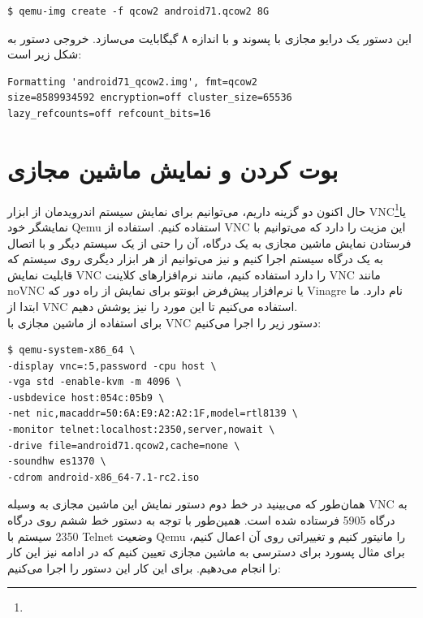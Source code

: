 \documentclass{article}
\begin{document}
\begin{latin}
\begin{verbatim}
$ qemu-img create -f qcow2 android71.qcow2 8G
\end{verbatim}
\end{latin}

این دستور یک درایو مجازی با پسوند  و با اندازه ۸ گیگابایت می‌سازد. خروجی دستور به شکل زیر است:

\begin{latin}
\begin{verbatim}
Formatting 'android71_qcow2.img', fmt=qcow2
size=8589934592 encryption=off cluster_size=65536
lazy_refcounts=off refcount_bits=16
\end{verbatim}
\end{latin}

\section*{بوت کردن و نمایش ماشین مجازی}

حال اکنون دو گزینه داریم، می‌توانیم برای نمایش سیستم اندرویدمان از ابزار VNC\footnote{}\cite{2}یا نمایشگر خود Qemu استفاده کنیم. استفاده از VNC این مزیت را دارد که می‌توانیم با فرستادن نمایش ماشین مجازی به یک درگاه، آن را حتی از یک سیستم دیگر و با اتصال به یک درگاه سیستم اجرا کنیم و نیز می‌توانیم از هر ابزار دیگری روی سیستم که قابلیت نمایش VNC را دارد استفاده کنیم، مانند نرم‌افزار‌های کلاینت VNC مانند noVNC \cite{3} یا نرم‌افزار پیش‌فرض ابونتو برای نمایش از راه دور که Vinagre \cite{4} نام دارد.
ما ابتدا از VNC استفاده می‌کنیم تا این مورد را نیز پوشش دهیم.
\\
برای استفاده از ماشین مجازی با VNC دستور زیر را اجرا می‌کنیم:

\begin{latin}
\begin{verbatim}
$ qemu-system-x86_64 \
-display vnc=:5,password -cpu host \
-vga std -enable-kvm -m 4096 \
-usbdevice host:054c:05b9 \
-net nic,macaddr=50:6A:E9:A2:A2:1F,model=rtl8139 \
-monitor telnet:localhost:2350,server,nowait \
-drive file=android71.qcow2,cache=none \
-soundhw es1370 \
-cdrom android-x86_64-7.1-rc2.iso	
\end{verbatim}
\end{latin}

همان‌طور که می‌بینید در خط دوم دستور نمایش این ماشین مجازی به وسیله VNC به درگاه 5905 فرستاده شده است. همین‌طور با توجه به دستور خط ششم روی درگاه 2350 سیستم با Telnet \cite{5} وضعیت Qemu را مانیتور کنیم و تغییراتی روی آن اعمال کنیم،‌ برای مثال پسورد برای دسترسی به ماشین مجازی تعیین کنیم که در ادامه نیز این کار را انجام می‌دهیم. برای این کار این دستور را اجرا می‌کنیم:
\end{document}
